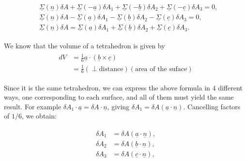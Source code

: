 \documentclass{article}
\begin{document}
\begin{align}\label{eq:tetrahedron_sf_balance}
\begin{split}
 & \underline{\Sigma}(\underline{n})\delta A + \underline{\Sigma}(-\underline{a})\delta A_{1} + \underline{\Sigma}(-\underline{b})\delta A_{2} + 
 \underline{\Sigma}(-\underline{c})\delta A_{3} = 0,\\
 & \underline{\Sigma}(\underline{n})\delta A - \underline{\Sigma}(\underline{a})\delta A_{1} - \underline{\Sigma}(\underline{b})\delta A_{2} - 
 \underline{\Sigma}(\underline{c})\delta A_{3} = 0,\\
 & \underline{\Sigma}(\underline{n})\delta A = \underline{\Sigma}(\underline{a})\delta A_{1} + \underline{\Sigma}(\underline{b})\delta A_{2} + 
 \underline{\Sigma}(\underline{c})\delta A_{3}.
\end{split}
\end{align}

We know that the volume of a tetrahedron is given by 
\begin{align}\label{eq:tetrahedron_vol}
 \begin{split}
  dV &= \frac{1}{6}\underline{a} \cdot \left(\underline{b} \times \underline{c} \right)\\
  &= \frac{1}{6} (\perp \textrm{distance})(\textrm{area of the suface})
 \end{split}
\end{align}

Since it is the same tetrahedron, we can express the above formula in $4$ different ways, one corresponding to each surface, and all of them must yield the same result. For example $\delta A_{1} \cdot \underline{a} = \delta A \cdot \underline{n}$, giving $\delta A_{1} = \delta A (\underline{a}\cdot \underline{n})$. 
Cancelling factors of $1/6$, we obtain:  

\begin{align}\label{eq:area_relations}
\begin{split}
 \delta A_{1} &= \delta A (\underline{a} \cdot \underline{n}), \\
 \delta A_{2} &= \delta A (\underline{b} \cdot \underline{n}), \\
 \delta A_{3} &= \delta A (\underline{c} \cdot \underline{n}), \\
\end{split}
\end{align}
\end{document}
